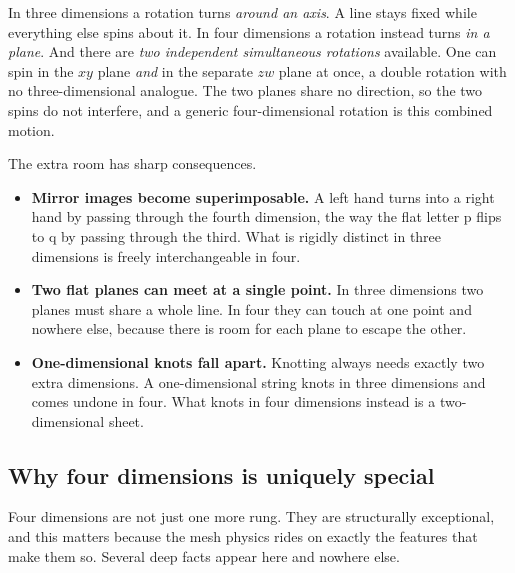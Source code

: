 In three dimensions a rotation turns \emph{around an axis}. A line stays fixed while everything else spins about it. In four dimensions a rotation instead turns \emph{in a plane}. And there are \emph{two independent simultaneous rotations} available. One can spin in the $xy$ plane \emph{and} in the separate $zw$ plane at once, a double rotation with no three-dimensional analogue. The two planes share no direction, so the two spins do not interfere, and a generic four-dimensional rotation is this combined motion.

The extra room has sharp consequences.

\begin{itemize}
\item \textbf{Mirror images become superimposable.} A left hand turns into a right hand by passing through the fourth dimension, the way the flat letter p flips to q by passing through the third. What is rigidly distinct in three dimensions is freely interchangeable in four.
\item \textbf{Two flat planes can meet at a single point.} In three dimensions two planes must share a whole line. In four they can touch at one point and nowhere else, because there is room for each plane to escape the other.
\item \textbf{One-dimensional knots fall apart.} Knotting always needs exactly two extra dimensions. A one-dimensional string knots in three dimensions and comes undone in four. What knots in four dimensions instead is a two-dimensional sheet.
\end{itemize}

\subsection{Why four dimensions is uniquely special}

Four dimensions are not just one more rung. They are structurally exceptional, and this matters because the mesh physics rides on exactly the features that make them so. Several deep facts appear here and nowhere else.

